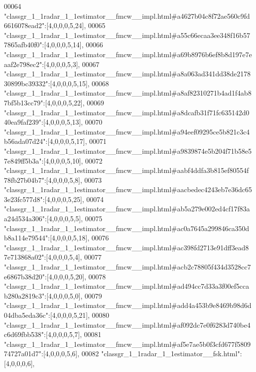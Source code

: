 \begin{DoxyCode}
00064 \textcolor{stringliteral}{"classgr\_1\_1radar\_1\_1estimator\_\_fmcw\_\_impl.html#a4627b04c8f72ae560c9fd6616078ead2"}:[4,0,0,0,5,24],
00065 \textcolor{stringliteral}{"classgr\_1\_1radar\_1\_1estimator\_\_fmcw\_\_impl.html#a55c66ecaa3ee348f16b577865afb40f0"}:[4,0,0,0,5,14],
00066 \textcolor{stringliteral}{"classgr\_1\_1radar\_1\_1estimator\_\_fmcw\_\_impl.html#a69b8976b6ef8b8d197e7eaaf2e798ec2"}:[4,0,0,0,5,3],
00067 \textcolor{stringliteral}{"classgr\_1\_1radar\_1\_1estimator\_\_fmcw\_\_impl.html#a8a063ad341dd38de217830899bc39332"}:[4,0,0,0,5,15],
00068 \textcolor{stringliteral}{"classgr\_1\_1radar\_1\_1estimator\_\_fmcw\_\_impl.html#a8af82310271b4ad1f4ab87bf5b13cc79"}:[4,0,0,0,5,22],
00069 \textcolor{stringliteral}{"classgr\_1\_1radar\_1\_1estimator\_\_fmcw\_\_impl.html#a8dcafb31f71fc635142d040ea9faf239"}:[4,0,0,0,5,13],
00070 \textcolor{stringliteral}{"classgr\_1\_1radar\_1\_1estimator\_\_fmcw\_\_impl.html#a94eef09295ce5b821c3c4b56ada07d24"}:[4,0,0,0,5,17],
00071 \textcolor{stringliteral}{"classgr\_1\_1radar\_1\_1estimator\_\_fmcw\_\_impl.html#a9839874e5b204f71b58e57e849ff5b3a"}:[4,0,0,0,5,10],
00072 \textcolor{stringliteral}{"classgr\_1\_1radar\_1\_1estimator\_\_fmcw\_\_impl.html#aabf4ddfa3b815ef80554f78fb27b04b7"}:[4,0,0,0,5,8],
00073 \textcolor{stringliteral}{"classgr\_1\_1radar\_1\_1estimator\_\_fmcw\_\_impl.html#aacbedec4243eb7e36dc653e23fc577d8"}:[4,0,0,0,5,25],
00074 \textcolor{stringliteral}{"classgr\_1\_1radar\_1\_1estimator\_\_fmcw\_\_impl.html#ab5a279e002ed4cf17f83aa24d534a306"}:[4,0,0,0,5,5],
00075 \textcolor{stringliteral}{"classgr\_1\_1radar\_1\_1estimator\_\_fmcw\_\_impl.html#ac0a7645a299846ca350db8a114e79544"}:[4,0,0,0,5,18],
00076 \textcolor{stringliteral}{"classgr\_1\_1radar\_1\_1estimator\_\_fmcw\_\_impl.html#ac398fd2713e91dff3ead87e713868a02"}:[4,0,0,0,5,4],
00077 \textcolor{stringliteral}{"classgr\_1\_1radar\_1\_1estimator\_\_fmcw\_\_impl.html#acb2c78805f434d3528cc7e6867b38d20"}:[4,0,0,0,5,20],
00078 \textcolor{stringliteral}{"classgr\_1\_1radar\_1\_1estimator\_\_fmcw\_\_impl.html#ad494cc7d33a3f00ef5ccab280a2819c3"}:[4,0,0,0,5,0],
00079 \textcolor{stringliteral}{"classgr\_1\_1radar\_1\_1estimator\_\_fmcw\_\_impl.html#add4a453b9e8469b98d6d04dba5eda36c"}:[4,0,0,0,5,21],
00080 \textcolor{stringliteral}{"classgr\_1\_1radar\_1\_1estimator\_\_fmcw\_\_impl.html#af092dc7e0f6283d740be4c6d69fbb538"}:[4,0,0,0,5,7],
00081 \textcolor{stringliteral}{"classgr\_1\_1radar\_1\_1estimator\_\_fmcw\_\_impl.html#af5e7ae5b0f3cfd677f580974727a01d7"}:[4,0,0,0,5,6],
00082 \textcolor{stringliteral}{"classgr\_1\_1radar\_1\_1estimator\_\_fsk.html"}:[4,0,0,0,6],

\end{DoxyCode}

